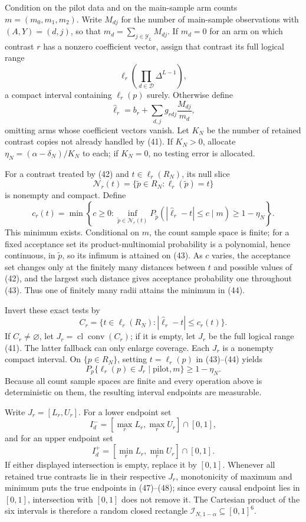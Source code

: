 Condition on the pilot data and on the main-sample arm counts \(m=(m_0,m_1,m_2)\).  Write \(M_{dj}\) for the number of main-sample observations with \((A,Y)=(d,j)\), so that \(m_d=\sum_{j\in\mathcal Y_L}M_{dj}\).  If \(m_d=0\) for an arm on which contrast \(r\) has a nonzero coefficient vector, assign that contrast its full logical range
\[
 \ell_r\!\left(\prod_{d\in\mathcal D}\Delta^{L-1}\right),                 \tag{41}
\]
a compact interval containing \(\ell_r(p)\) surely.  Otherwise define
\[
 \widehat\ell_r=b_r+\sum_{d,j}g_{rdj}\frac{M_{dj}}{m_d},                   \tag{42}
\]
omitting arms whose coefficient vectors vanish.  Let \(K_N\) be the number of retained contrast copies not already handled by (41).  If \(K_N>0\), allocate \(\eta_N=(\alpha-\delta_N)/K_N\) to each; if \(K_N=0\), no testing error is allocated.

For a contrast treated by (42) and \(t\in\ell_r(R_N)\), its null slice
\[
 \mathcal N_r(t)=\{\widetilde p\in R_N:\ell_r(\widetilde p)=t\}            \tag{43}
\]
is nonempty and compact.  Define
\[
 c_r(t)=\min\left\{c\geq0:
 \inf_{\widetilde p\in\mathcal N_r(t)}
 P_{\widetilde p}\left(|\widehat\ell_r-t|\leq c\mid m\right)
 \geq1-\eta_N\right\}.                                                     \tag{44}
\]
This minimum exists.  Conditional on \(m\), the count sample space is finite; for a fixed acceptance set its product-multinomial probability is a polynomial, hence continuous, in \(\widetilde p\), so its infimum is attained on (43).  As \(c\) varies, the acceptance set changes only at the finitely many distances between \(t\) and possible values of (42), and the largest such distance gives acceptance probability one throughout (43).  Thus one of finitely many radii attains the minimum in (44).

Invert these exact tests by
\[
 C_r=\{t\in\ell_r(R_N):|\widehat\ell_r-t|\leq c_r(t)\}.                   \tag{45}
\]
If \(C_r\neq\varnothing\), let \(J_r=\operatorname{cl}\operatorname{conv}(C_r)\); if it is empty, let \(J_r\) be the full logical range (41).  The latter fallback can only enlarge coverage.  Each \(J_r\) is a nonempty compact interval.  On \(\{p\in R_N\}\), setting \(t=\ell_r(p)\) in (43)--(44) yields
\[
 P_p\{\ell_r(p)\in J_r\mid\text{pilot},m\}\geq1-\eta_N.                 \tag{46}
\]
Because all count sample spaces are finite and every operation above is deterministic on them, the resulting interval endpoints are measurable.

Write \(J_r=[L_r,U_r]\).  For a lower endpoint set
\[
 I_d^-=[\max_rL_r,\max_rU_r]\cap[0,1],                                    \tag{47}
\]
and for an upper endpoint set
\[
 I_d^+=[\min_rL_r,\min_rU_r]\cap[0,1].                                    \tag{48}
\]
If either displayed intersection is empty, replace it by \([0,1]\).  Whenever all retained true contrasts lie in their respective \(J_r\), monotonicity of maximum and minimum puts the true endpoints in (47)--(48); since every causal endpoint lies in \([0,1]\), intersection with \([0,1]\) does not remove it.  The Cartesian product of the six intervals is therefore a random closed rectangle \(\mathcal I_{N,1-\alpha}\subseteq[0,1]^6\).

